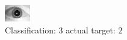 \begin{figure}[h!]
\begin{center}
\includegraphics[width=0.60\columnwidth]{figures/ID1742_class_3_target_2.png}
\end{center}
\caption{ Classification: 3 actual target: 2}
\label{fig:ID1742_class_3_target_2}
\end{figure}
